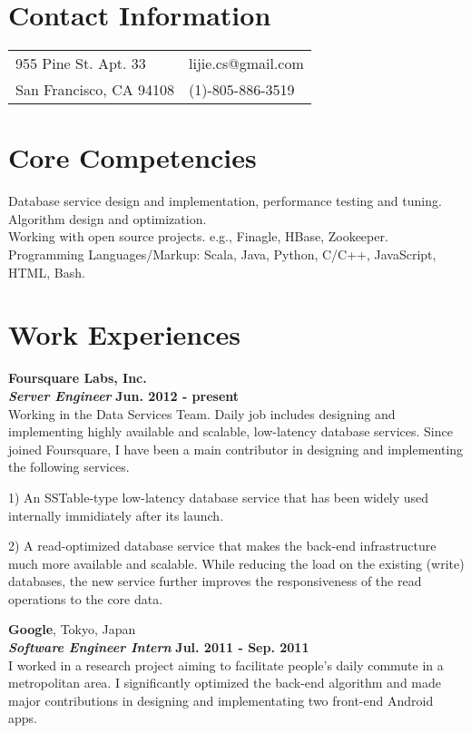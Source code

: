 \documentclass[margin,line]{res}
\begin{document}

\begin{resume}
\section{\sc Contact Information}
\vspace{.05in}
\begin{tabular}{@{}p{2in}p{4in}}
955 Pine St. Apt. 33 & lijie.cs@gmail.com \\
San Francisco, CA 94108 & (1)-805-886-3519 \\
\end{tabular}

\section{\sc Core Competencies}
Database service design and implementation, performance testing and tuning. \\
Algorithm design and optimization. \\
Working with open source projects. e.g., Finagle, HBase, Zookeeper. \\
Programming Languages/Markup: Scala, Java, Python, C/C++, JavaScript, HTML, Bash.

\section{\sc Work Experiences}
{\bf{Foursquare Labs, Inc.}}\\
{\bf{\em Server Engineer}} \hfill {\bf Jun. 2012 - present}\\
Working in the Data Services Team. Daily job includes designing and implementing highly available and scalable, low-latency database services. Since joined Foursquare, I have been a main contributor in designing and implementing the following services.

1) An SSTable-type low-latency database service that has been widely used internally immidiately after its launch.

2) A read-optimized database service that makes the back-end infrastructure much more available and scalable. While reducing the load on the existing (write) databases, the new service further improves the responsiveness of the read operations to the core data.

{\bf{Google}}, Tokyo, Japan\\
{\bf{\em Software Engineer Intern}} \hfill {\bf Jul. 2011 - Sep. 2011}\\
I worked in a research project aiming to facilitate people's daily commute in a metropolitan area. I significantly optimized the back-end algorithm and made major contributions in designing and implementating two front-end Android apps.


\end{resume}
\end{document}
